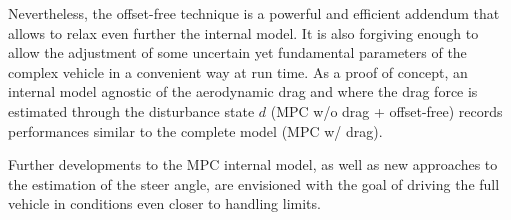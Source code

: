 \documentclass[conference]{IEEEtran} %
\begin{document}
Nevertheless, the offset-free technique is a powerful and efficient addendum that allows to relax even further the internal model. It is also forgiving enough to allow the adjustment of some uncertain yet fundamental parameters of the complex vehicle in a convenient way at run time.
As a proof of concept, an internal model agnostic of the aerodynamic drag and where the drag force is estimated through the disturbance state $d$ (MPC w/o drag + offset-free) records performances similar to the complete model (MPC w/ drag).

Further developments to the MPC internal model, as well as new approaches to the estimation of the steer angle, are envisioned with the goal of driving the full vehicle in conditions even closer to handling limits.
\label{sec:conclusion}




\end{document}
